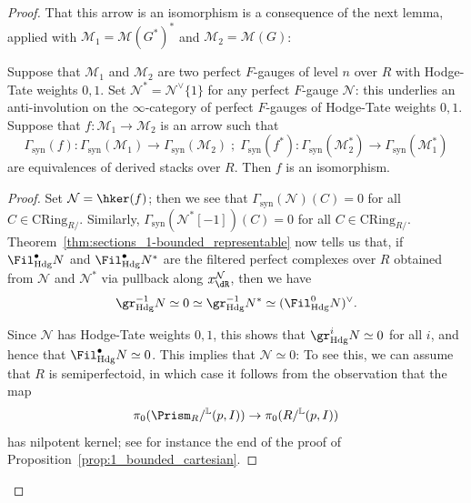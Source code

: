 \documentclass[10pt]{amsart}
\begin{document}
\begin{proof}
That this arrow is an isomorphism is a consequence of the next lemma, applied with $\mathcal{M}_1 = \mathcal{M}(G^*)^*$ and $\mathcal{M}_2 = \mathcal{M}(G)$:
\begin{lemma}
\label{lem:G_functor_conservative}
Suppose that $\mathcal{M}_1$ and $\mathcal{M}_2$ are two perfect $F$-gauges of level $n$ over $R$ with Hodge-Tate weights $0,1$. Set $\mathcal{N}^* = \mathcal{N}^\vee\{1\}$ for any perfect $F$-gauge $\mathcal{N}$: this underlies an anti-involution on the $\infty$-category of perfect $F$-gauges of Hodge-Tate weights $0,1$. Suppose that $f:\mathcal{M}_1\to \mathcal{M}_2$ is an arrow such that 
\[
\Gamma_{\mathrm{syn}}(f):\Gamma_{\mathrm{syn}}(\mathcal{M}_1)\to \Gamma_{\mathrm{syn}}(\mathcal{M}_2)\;;\;\Gamma_{\mathrm{syn}}(f^*):\Gamma_{\mathrm{syn}}(\mathcal{M}^*_2)\to \Gamma_{\mathrm{syn}}(\mathcal{M}^*_1)
\]
are equivalences of derived stacks over $R$. Then $f$ is an isomorphism. 
\end{lemma} 
\begin{proof}
Set $\mathcal{N} = \hker(f)$; then we see that $\Gamma_{\mathrm{syn}}(\mathcal{N})(C) = 0$ for all $C\in \mathrm{CRing}_{R/}$. Similarly, $\Gamma_{\mathrm{syn}}(\mathcal{N}^*[-1])(C) = 0$ for all $C\in \mathrm{CRing}_{R/}$. Theorem~\ref{thm:sections_1-bounded_representable} now tells us that, if $\Fil^\bullet_{\mathrm{Hdg}}N$ and $\Fil^\bullet_{\mathrm{Hdg}}N^*$ are the filtered perfect complexes over $R$ obtained from $\mathcal{N}$ and $\mathcal{N}^*$ via pullback along $x^{\mathcal{N}}_{\dR}$, then  we have
\[
\gr^{-1}_{\mathrm{Hdg}}N \simeq 0\simeq \gr^{-1}_{\mathrm{Hdg}}N^*\simeq(\Fil^0_{\mathrm{Hdg}}N)^\vee.
\] 


Since $\mathcal{N}$ has Hodge-Tate weights $0,1$, this shows that $\gr^i_{\mathrm{Hdg}}N \simeq 0$ for all $i$, and hence that $\Fil^\bullet_{\mathrm{Hdg}}N\simeq 0$. This implies that $\mathcal{N}\simeq 0$: To see this, we can assume that $R$ is semiperfectoid, in which case it follows from the observation that the map 
\[
\pi_0(\Prism_R/{}^{\mathbb{L}}(p,I))\to \pi_0(R/{}^{\mathbb{L}}(p,I))
\]
has nilpotent kernel; see for instance the end of the proof of Proposition~\ref{prop:1_bounded_cartesian}.
\end{proof}

\end{proof}
\end{document}
